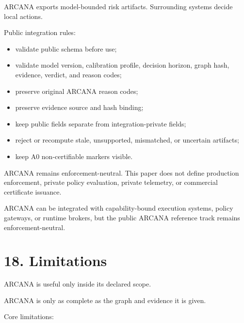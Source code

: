 \documentclass[
  american,
  a4paper,
  10pt]{article}
\providecommand{\tightlist}{%
  \setlength{\itemsep}{0pt}\setlength{\parskip}{0pt}}
\begin{document}
ARCANA exports model-bounded risk artifacts. Surrounding systems decide local actions.

Public integration rules:

\begin{itemize}
\tightlist
\item
  validate public schema before use;
\item
  validate model version, calibration profile, decision horizon, graph hash, evidence,
  verdict, and reason codes;
\item
  preserve original ARCANA reason codes;
\item
  preserve evidence source and hash binding;
\item
  keep public fields separate from integration-private fields;
\item
  reject or recompute stale, unsupported, mismatched, or uncertain artifacts;
\item
  keep A0 non-certifiable markers visible.
\end{itemize}

ARCANA remains enforcement-neutral. This paper does not define production enforcement,
private policy evaluation, private telemetry, or commercial certificate issuance.

ARCANA can be integrated with capability-bound execution systems, policy gateways, or
runtime brokers, but the public ARCANA reference track remains enforcement-neutral.

\section{18. Limitations}\label{18-limitations}

ARCANA is useful only inside its declared scope.

ARCANA is only as complete as the graph and evidence it is given.

Core limitations:
\end{document}
